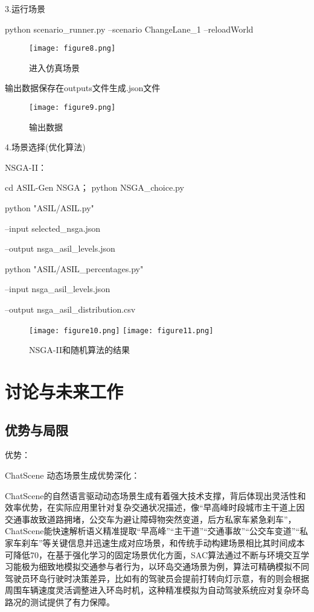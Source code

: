 3.运行场景

python scenario\_runner.py --scenario ChangeLane\_1 --reloadWorld


\begin{figure}[htbp]
	\centering
	\texttt{[image: figure8.png]} %
	\caption{进入仿真场景} %
	\label{fig:example} %
\end{figure}

输出数据保存在outputs文件生成.json文件


\begin{figure}[htbp]
	\centering
	\texttt{[image: figure9.png]} %
	\caption{输出数据} %
	\label{fig:example} %
\end{figure}
4.场景选择(优化算法)


NSGA-II： 

cd ASIL-Gen NSGA；
python NSGA\_choice.py 

python "ASIL/ASIL.py" \

--input selected\_nsga.json \

--output nsga\_asil\_levels.json

python "ASIL/ASIL\_percentages.py" \

--input nsga\_asil\_levels.json \

--output nsga\_asil\_distribution.csv 



\begin{figure}[h] %
	\centering %
	\texttt{[image: figure10.png]} %
	\hfill %
	\texttt{[image: figure11.png]} %
	\caption{NSGA-II和随机算法的结果} %
	\label{fig:side} %
\end{figure}




\section{讨论与未来工作}
\subsection{优势与局限}

优势：

ChatScene 动态场景生成优势深化​：

ChatScene的自然语言驱动动态场景生成有着强大技术支撑，背后体现出灵活性和效率优势，在实际应用里针对复杂交通状况描述，像“早高峰时段城市主干道上因交通事故致道路拥堵，公交车为避让障碍物突然变道，后方私家车紧急刹车”，ChatScene能快速解析语义精准提取“早高峰”“主干道”“交通事故”“公交车变道”“私家车刹车”等关键信息并迅速生成对应场景，和传统手动构建场景相比其时间成本可降低70，在基于强化学习的固定场景优化方面，SAC算法通过不断与环境交互学习能极为细致地模拟交通参与者行为\cite{程娟2019基于梯度提升决策树的高速公路行程时间预测模型}，以环岛交通场景为例，算法可精确模拟不同驾驶员环岛行驶时决策差异，比如有的驾驶员会提前打转向灯示意，有的则会根据周围车辆速度灵活调整进入环岛时机，这种精准模拟为自动驾驶系统应对复杂环岛路况的测试提供了有力保障。​


